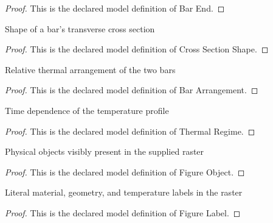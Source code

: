 \begin{proof}
  This is the declared model definition of Bar End.
\end{proof}
\begin{definition}
  \label{def:physics:phyx-mini-0468:phyxminiproblems-problemphyxmini0468-crosssectionshape}
  Shape of a bar's transverse cross section
\end{definition}
\begin{proof}
  This is the declared model definition of Cross Section Shape.
\end{proof}
\begin{definition}
  \label{def:physics:phyx-mini-0468:phyxminiproblems-problemphyxmini0468-bararrangement}
  Relative thermal arrangement of the two bars
\end{definition}
\begin{proof}
  This is the declared model definition of Bar Arrangement.
\end{proof}
\begin{definition}
  \label{def:physics:phyx-mini-0468:phyxminiproblems-problemphyxmini0468-thermalregime}
  Time dependence of the temperature profile
\end{definition}
\begin{proof}
  This is the declared model definition of Thermal Regime.
\end{proof}
\begin{definition}
  \label{def:physics:phyx-mini-0468:phyxminiproblems-problemphyxmini0468-figureobject}
  Physical objects visibly present in the supplied raster
\end{definition}
\begin{proof}
  This is the declared model definition of Figure Object.
\end{proof}
\begin{definition}
  \label{def:physics:phyx-mini-0468:phyxminiproblems-problemphyxmini0468-figurelabel}
  Literal material, geometry, and temperature labels in the raster
\end{definition}
\begin{proof}
  This is the declared model definition of Figure Label.
\end{proof}
